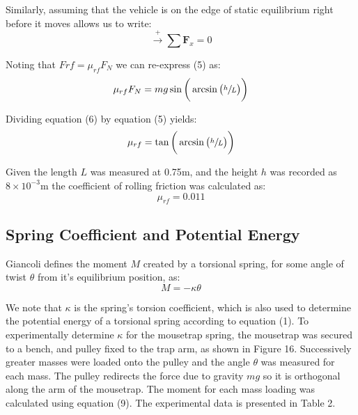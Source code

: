 \documentclass[a4paper]{article}
\newlength{\arrow}
\begin{document}
Similarly, assuming that the vehicle is on the edge of static equilibrium right before it moves allows us to write:
\begin{equation}
	\stackrel{+}\rightarrow \sum \boldsymbol{F}_x = 0
\end{equation}

Noting that $F{rf} = \mu_{rf} F_N$ we can re-express (5) as:
\begin{equation}
	\mu_{rf} F_N = mg \sin \bigg( \arcsin\big( \sfrac{h}{L} \big) \bigg)
\end{equation}

Dividing equation (6) by equation (5) yields:
\begin{equation}
	\mu_{rf} = \tan \bigg( \arcsin\big( \sfrac{h}{L} \big) \bigg)
\end{equation}

Given the length $L$ was measured at 0.75$\si{\meter}$, and the height $h$ was recorded as $8 \times 10^{-3} \si{\meter}$ the coefficient of rolling friction was calculated as:
\begin{equation}
	\mu_{rf} = 0.011
\end{equation}


\subsection{Spring Coefficient and Potential Energy}
Giancoli defines the moment $M$ created by a torsional spring, for some angle of twist $\theta$ from it's equilibrium position, as:
\begin{equation}
	M = -\kappa \theta
\end{equation} 

We note that $\kappa$ is the spring's torsion coefficient, which is also used to determine the potential energy of a torsional spring according to equation (1). To experimentally determine $\kappa$ for the mousetrap spring, the mousetrap was secured to a bench, and pulley fixed to the trap arm, as shown in Figure 16. Successively greater masses were loaded onto the pulley and the angle $\theta$ was measured for each mass. The pulley redirects the force due to gravity $mg$ so it is orthogonal along the arm of the mousetrap. The moment for each mass loading was calculated using equation (9). The experimental data is presented in Table 2.
\end{document}
